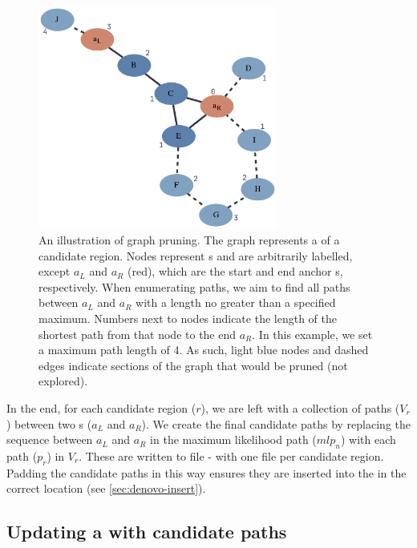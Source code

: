 \begin{figure}
    \centering
    \includegraphics[width=0.7\textwidth]{Chapter1/Figs/pruning.png}
    \caption{An illustration of graph pruning. The graph represents a \dbg{} of a candidate region. Nodes represent \kmer{}s and are arbitrarily labelled, except $a_L$ and $a_R$ (red), which are the start and end anchor \kmer{}s, respectively. When enumerating paths, we aim to find all paths between $a_L$ and $a_R$ with a length no greater than a specified maximum. Numbers next to nodes indicate the length of the shortest path from that node to the end \kmer{} $a_R$. In this example, we set a maximum path length of 4. As such, light blue nodes and dashed edges indicate sections of the graph that would be pruned (not explored).}
    \label{fig:pruning}
\end{figure}

\hspace{0.75cm}

\noindent
In the end, for each candidate region ($r$), we are left with a collection of paths ($V_r$) between two \kmer{}s ($a_L$ and $a_R$). We create the final candidate paths by replacing the sequence between $a_L$ and $a_R$ in the maximum likelihood path ($mlp_n$) with each path ($p_r$) in $V_r$. These are written to file - with one file per candidate region. Padding the candidate paths in this way ensures they are inserted into the \prg{} in the correct location (see \autoref{sec:denovo-insert}). 


\subsection{Updating a \panrg{} with candidate paths}
\label{sec:denovo-insert}

